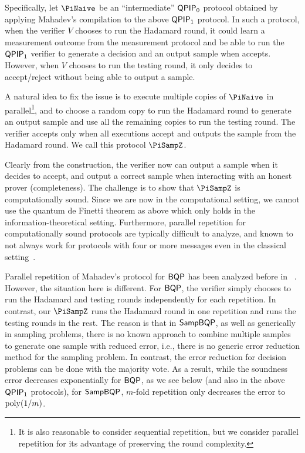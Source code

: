 Specifically, let $\PiNaive$ be an ``intermediate'' $\operatorname{\mathsf{QPIP}}_0$ protocol obtained by applying Mahadev's compilation to the above $\operatorname{\mathsf{QPIP}}_1$ protocol. In such a protocol, when the verifier $V$ chooses to run the Hadamard round, it could learn a measurement outcome from the measurement protocol and be able to run the $\operatorname{\mathsf{QPIP}}_1$ verifier to generate a decision and an output sample when accepts. However, when  $V$ chooses to run the testing round, it only decides to accept/reject without being able to output a sample. 

 A natural idea to fix the issue is to execute multiple copies of $\PiNaive$ in parallel\footnote{It is also reasonable to consider sequential repetition, but we consider parallel repetition for its advantage of preserving the round complexity.}, and to choose a random copy to run the Hadamard round to generate an output sample and use all the remaining copies to run the testing round. The verifier accepts only when all executions accept and outputs the sample from the Hadamard round. We call this protocol $\PiSampZ$.

Clearly from the construction, the verifier now can output a sample when it decides to accept, and output a correct sample when interacting with an honest prover (completeness). The challenge is to show that $\PiSampZ$ is computationally sound. Since we are now in the computational setting, we cannot use the quantum de Finetti theorem as above which only holds in the information-theoretical setting. Furthermore, parallel repetition for computationally sound protocols are typically difficult to analyze, and known to not always work for protocols with four or more messages even in the classical setting~\cite{BIN97,PW12}.


 Parallel repetition of Mahadev's protocol for $\operatorname{\mathsf{BQP}}$ has been analyzed before in ~\cite{arXiv:ChiaChungYam19, arXiv:AlaChiHun19}. However, the situation here is different. 
 For $\operatorname{\mathsf{BQP}}$, the verifier simply chooses to run the Hadamard and testing rounds independently for each repetition. In contrast, our $\PiSampZ$ runs the Hadamard round in one repetition and runs the testing rounds in the rest. The reason is that in $\operatorname{\mathsf{SampBQP}}$, as well as generically in sampling problems, there is no known approach to combine multiple samples to generate one sample with reduced error, i.e., there is no generic error reduction method for the sampling problem. 
In contrast, the error reduction for decision problems can be done with the majority vote. 
As a result, while the soundness error decreases exponentially for $\operatorname{\mathsf{BQP}}$, as we see below (and also in the above $\operatorname{\mathsf{QPIP}}_1$ protocols), for $\operatorname{\mathsf{SampBQP}}$, $m$-fold repetition only decreases the error to $\operatorname*{\operatorname{poly}}(1/m)$. 


